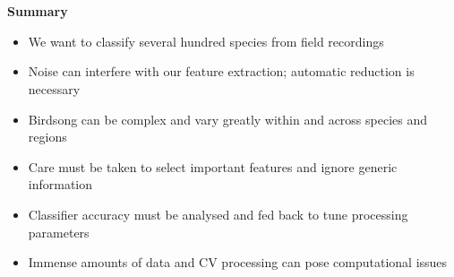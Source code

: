 \documentclass[t, xcolor={dvipsnames}]{beamer}
\begin{document}
\section{}
\begin{frame}[fragile]
  \scriptsize
  \begin{figure}
    \def\svgwidth{0.85\columnwidth}
    
  \end{figure}
\end{frame}

\begin{frame}[fragile]
  \vspace{0.5cm}
  {\bfseries\Large Summary}\\
  \vspace{0.3cm}
    \begin{itemize}
      \item We want to classify several hundred species from field recordings
      \item Noise can interfere with our feature extraction; automatic reduction is necessary
      \item Birdsong can be complex and vary greatly within and across species and regions
      \item Care must be taken to select important features and ignore generic information
      \item Classifier accuracy must be analysed and fed back to tune processing parameters
      \item Immense amounts of data and CV processing can pose computational issues
    \end{itemize}
\end{frame}

\begin{frame}[fragile]
  \nocite{DBLP:conf/mlsp/BriggsHRELCHHBFINTFTNNHRMDVMDCHLM13}
  \nocite{DBLP:conf/mlsp/Fodor13}
  \nocite{DBLP:conf/clef/Lasseck15}
  \nocite{DBLP:conf/clef/Lasseck15a}
  \nocite{DBLP:david_nicholson-proc-scipy-2016}
  
\end{frame}
\end{document}
